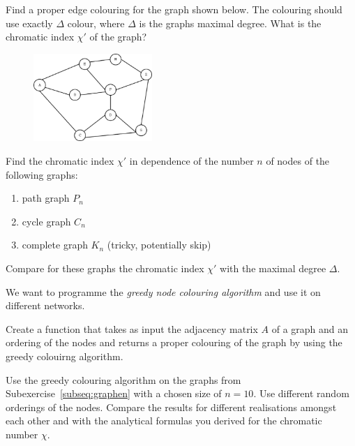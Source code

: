    
\clearpage 
\exercise[%
  topic =Edge Colouring 
    ]

\subexercise[%
  topic=Edge Colouring of a Graph,
    ]

Find a proper edge colouring for the graph shown below. The colouring should use exactly $\Delta$ colour, where $\Delta$ is the graphs maximal degree. What is the chromatic index $\chi'$ of the graph?

\begin{figure}[h]
\includegraphics[width=0.4\textwidth]{graph_colouring.eps}
\end{figure}

\subexercise[%
  topic=Edge colouring of Graph Models,
    ]

Find the  chromatic index  $\chi'$ in dependence of the number $n$ of nodes of the following graphs:   

\begin{enumerate}
\item path graph $P_n$
\item cycle graph $C_n$
\item complete graph $K_n$ (tricky, potentially skip)
\end{enumerate}

Compare for these graphs the chromatic index  $\chi'$  with the maximal degree $\Delta$.

\exercise[%
  topic = Coding the Greedy Colouring
    ]

We want to programme the \emph{greedy node colouring algorithm} and use it on different networks.

\subexercise[%
  topic=Greedy Colouring,
    ]
    
    
    Create a function that takes as input the adjacency matrix $A$ of a graph and an ordering of the nodes and returns a proper colouring of the graph by using the greedy colouirng algorithm. 
    

\subexercise[%
  topic=Greedy Coloruing of Graph Models,
    ]
    
Use the greedy colouring algorithm on the graphs from Subexercise~\ref{subseq:graphen} with a chosen size of $n=10$. Use different random orderings of the nodes. Compare the results for different realisations amongst each other and with the analytical formulas you derived for the chromatic number $\chi$.
    
